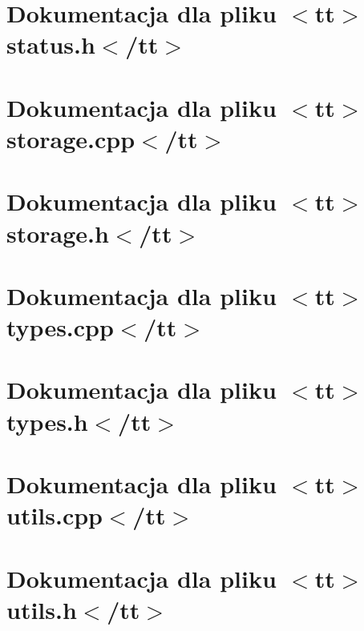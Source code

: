 \documentclass[twoside]{book}
\newcommand{\+}{\discretionary{\mbox{\scriptsize$\hookleftarrow$}}{}{}}
\begin{document}
\chapter{Dokumentacja dla pliku \texorpdfstring{$<$}{<}tt\texorpdfstring{$>$}{>}status.\+h\texorpdfstring{$<$}{<}/tt\texorpdfstring{$>$}{>}}
\label{md_documentation_status_h}

\chapter{Dokumentacja dla pliku \texorpdfstring{$<$}{<}tt\texorpdfstring{$>$}{>}storage.\+cpp\texorpdfstring{$<$}{<}/tt\texorpdfstring{$>$}{>}}
\label{md_documentation_storage_cpp}

\chapter{Dokumentacja dla pliku \texorpdfstring{$<$}{<}tt\texorpdfstring{$>$}{>}storage.\+h\texorpdfstring{$<$}{<}/tt\texorpdfstring{$>$}{>}}
\label{md_documentation_storage_h}

\chapter{Dokumentacja dla pliku \texorpdfstring{$<$}{<}tt\texorpdfstring{$>$}{>}types.\+cpp\texorpdfstring{$<$}{<}/tt\texorpdfstring{$>$}{>}}
\label{md_documentation_types_cpp}

\chapter{Dokumentacja dla pliku \texorpdfstring{$<$}{<}tt\texorpdfstring{$>$}{>}types.\+h\texorpdfstring{$<$}{<}/tt\texorpdfstring{$>$}{>}}
\label{md_documentation_types_h}

\chapter{Dokumentacja dla pliku \texorpdfstring{$<$}{<}tt\texorpdfstring{$>$}{>}utils.\+cpp\texorpdfstring{$<$}{<}/tt\texorpdfstring{$>$}{>}}
\label{md_documentation_utils_cpp}

\chapter{Dokumentacja dla pliku \texorpdfstring{$<$}{<}tt\texorpdfstring{$>$}{>}utils.\+h\texorpdfstring{$<$}{<}/tt\texorpdfstring{$>$}{>}}
\label{md_documentation_utils_h}

\end{document}
